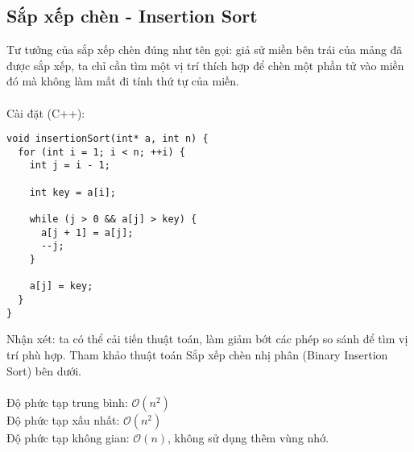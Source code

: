 \documentclass[]{article}
\begin{document}
\subsection{Sắp xếp chèn - Insertion Sort}
Tư tưởng của sắp xếp chèn đúng như tên gọi: giả sử miền bên trái của mảng đã được sắp xếp, ta chỉ cần tìm một vị trí thích hợp để chèn một phần tử vào miền đó mà không làm mất đi tính thứ tự của miền.
\\\\
Cài đặt (C++):
\begin{lstlisting}
void insertionSort(int* a, int n) {
  for (int i = 1; i < n; ++i) {
    int j = i - 1;

    int key = a[i];

    while (j > 0 && a[j] > key) {
      a[j + 1] = a[j];
      --j;
    }

    a[j] = key;
  }
}
\end{lstlisting}
Nhận xét: ta có thể cải tiến thuật toán, làm giảm bớt các phép so sánh để tìm vị trí phù hợp. Tham khảo thuật toán Sắp xếp chèn nhị phân (Binary Insertion Sort) bên dưới.
\\\\
Độ phức tạp trung bình: $\mathcal{O}(n^2)$
\\
Độ phức tạp xấu nhất: $\mathcal{O}(n^2)$
\\
Độ phức tạp không gian: $\mathcal{O}(n)$, không sử dụng thêm vùng nhớ.
\end{document}
